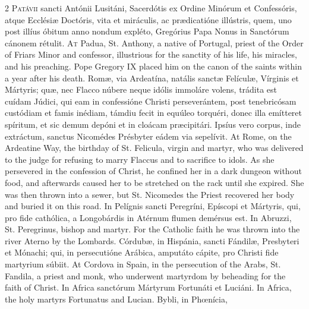 \begin{paracol}{2}
\lettrine[lines=2]{P}{atávii} sancti Antónii 
 Lusitáni, Sacerdótis ex Ordine Minórum et Confessóris, atque Ecclésiæ 
 Doctóris, vita et miráculis, ac prædicatióne illústris, quem, uno post illíus óbitum anno nondum expléto, Gregórius Papa Nonus in Sanctórum cánonem 
 rétulit.
\switchcolumn
{}
\lettrine[lines=2]{A}{t} Padua, St. Anthony, a native of 
 Portugal, priest of the Order of Friars Minor and confessor, illustrious for 
 the sanctity of his life, his miracles, and his preaching. Pope 
 Gregory IX placed him on the canon of the saints within a year after his 
 death.
\switchcolumn*
{}
Romæ, via Ardeatína, 
 natális sanctæ Felículæ, Vírginis et Mártyris; quæ, nec Flacco núbere neque 
 idólis immoláre volens, trádita est cuídam Júdici, qui eam in confessióne 
 Christi perseverántem, post tenebricósam custódiam et famis inédiam, támdiu 
 fecit in equúleo torquéri, donec illa emítteret spíritum, et sic demum 
 depóni et in cloácam præcipitári. Ipsíus vero corpus, inde extráctum, 
 sanctus Nicomédes Présbyter eádem via sepelívit.
\switchcolumn
{}
At Rome, on the Ardeatine Way, the 
 birthday of St. Felicula, virgin and martyr, who was delivered to the judge 
 for refusing to marry Flaccus and to sacrifice to idols. As she 
 persevered in the confession of Christ, he confined her in a dark dungeon 
 without food, and afterwards caused her to be stretched on the rack until 
 she expired. She was then thrown into a sewer, but St. Nicomedes the 
 Priest recovered her body and buried it on this road.
\switchcolumn*
{}
In Pelígnis sancti 
 Peregríni, Epíscopi et Mártyris, qui, pro fide cathólica, a Longobárdis in 
 Atérnum flumen demérsus est.
\switchcolumn
{}
In Abruzzi, St. Peregrinus, bishop 
 and martyr. For the Catholic faith he was thrown into the river Aterno 
 by the Lombards.
\switchcolumn*
{}
Córdubæ, in Hispánia, 
 sancti Fándilæ, Presbyteri et Mónachi; qui, in persecutióne Arábica, 
 amputáto cápite, pro Christi fide martyrium súbiit.
\switchcolumn
{}
At Cordova in Spain, in the 
 persecution of the Arabs, St. Fandila, a priest and monk, who underwent 
 martyrdom by beheading for the faith of Christ.
\switchcolumn*
{}
In Africa sanctórum 
 Mártyrum Fortunáti et Luciáni.
\switchcolumn
{}
In Africa, the holy martyrs 
 Fortunatus and Lucian.
\switchcolumn*
{}
Bybli, in Phœnícia, 

\end{paracol}
